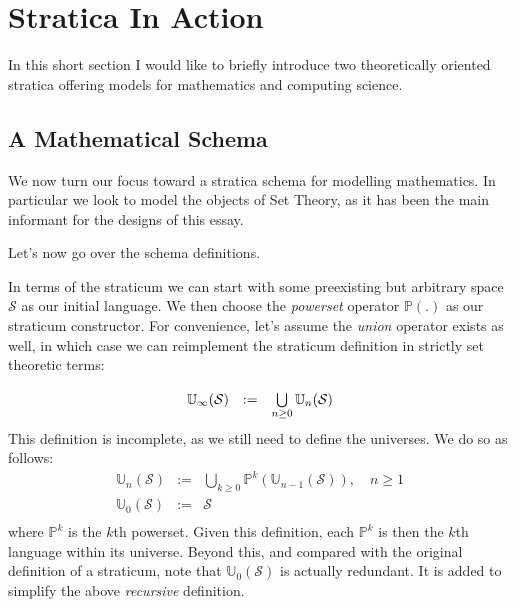 \documentclass[twoside]{article}
\newcommand{\powerset}[2][P]{\ensuremath{\mathbb{#1}(#2)}}
\newcommand{\nthps}[2][P]{\ensuremath{\mathbb{#1}^{#2}}}
\newcommand{\nthus}[2][U]{\ensuremath{\mathbb{#1}_{#2}}}
\newcommand{\psunion}[2][P]{\ensuremath{\bigcup\limits_{#2\ge 0}\mathbb{#1}^{#2}}}
\newcommand{\usunion}[2][U]{\ensuremath{\bigcup\limits_{#2\ge 0}\mathbb{#1}_{#2}}}
\newcommand{\stratified}{\ensuremath{\mathbb{U}_\infty}}
\newcommand{\of}[1]{\ensuremath{(\mathcal{#1})}}
\newcommand{\col}[1][0ex]{& \hspace{#1}}
\begin{document}
\section*{Stratica In Action}

In this short section I would like to briefly introduce two theoretically oriented stratica offering models
for mathematics and computing science.

\subsection*{A Mathematical Schema}

We now turn our focus toward a stratica schema for modelling mathematics. In particular we look to model the objects
of Set Theory, as it has been the main informant for the designs of this essay.

Let's now go over the schema definitions.

In terms of the straticum we can start with some preexisting but arbitrary space $ \mathcal{S} $ as our initial language.
We then choose the \emph{powerset} operator $ \powerset{.} $ as our straticum constructor. For convenience, let's assume
the \emph{union} operator exists as well, in which case we can reimplement the straticum definition in strictly set
theoretic terms:
$$ \def\arraystretch{1.75}
\begin{array}{rrl}
\stratified\of{S}	& := \col \usunion{n}\of{S}				\\
\end{array} $$
This definition is incomplete, as we still need to define the universes. We do so as follows:
\begin{eqnarray*}
\nthus{n}\of{S} & := & \psunion{k}(\nthus{n-1}\of{S}),\quad n\ge 1		\\[1ex]
\nthus{0}\of{S} & := & \mathcal{S}						\\
\end{eqnarray*}
where $ \nthps{k} $ is the $ k $th powerset. Given this definition, each $ \nthps{k} $ is then the $ k $th language within
its universe. Beyond this, and compared with the original definition of a straticum, note that $ \nthus{0}\of{S} $ is actually
redundant. It is added to simplify the above \emph{recursive} definition.
\end{document}
